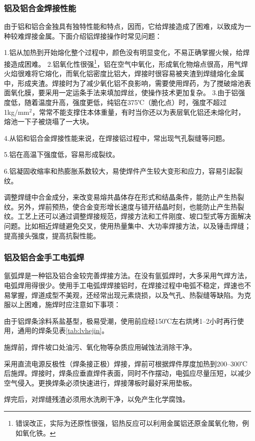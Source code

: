 \documentclass{ctexbook}
\begin{document}
\subsubsection{铝及铝合金焊接性能}
由于铝和铝合金独具有独特性能和特点，因而，它给焊接造成了困难，以致成为一种较难焊接金属。下面介绍铝焊接操作时常见问题：

1.铝从加热到开始熔化整个过程中，颜色没有明显变化，不易正确掌握火候，给焊接造成困难。
2.铝氧化性很强\footnote{错误改正，实际为还原性很强，铝热反应可以利用金属铝还原金属氧化物，例如氧化铁。}，铝在空气中氧化，形成氧化物熔点很高，用气焊火焰很难将它熔化，而氧化铝密度比铝大，焊接时很容易被夹渣到焊缝熔化金属中，形成夹渣。焊接时为了减少氧化铝不良影响，需要使用焊药，为了搅破熔池表面氧化膜，要采用一定运条手法来填加焊丝，使操作技术更加复杂。
3.由于铝强度低，随着温度升高，强度更低，纯铝在375℃（脆化点）时，强度不超过1kg/mm$^{2}$，常常不能支撑住本体重量，有时当你还以为表层氧化铝还未熔化时，熔池一下子被烧塌了一大块。

4.从铝和铝合金焊接性能来说，在焊接铝过程中，常出现气孔裂缝等问题。

5.铝在高温下强度低，容易形成裂纹。

6.铝凝固收缩率和热膨胀系数较大，易使焊件产生较大变形和应力，容易引起裂纹。

调整焊缝中合金成分，来改变易熔共晶体存在形式和结晶条件，能防止产生热裂纹。另外，焊前预热，使合金变形增长速度与错开结晶时刻，也能防止产生热裂纹。工艺上还可以通过调整焊接规范，焊接方法和工件刚度、坡口型式等方面解决问题。比如相近焊缝避免交叉，使用热量集中、大功率焊接方法，以及锤击焊缝；提高接头强度，提高抗裂性能。
\subsubsection{铝及铝合金手工电弧焊}	
氩弧焊是一种铝及铝合金较完善焊接方法。在没有氩弧焊时，大多采用气焊方法，电弧焊用得很少。使用手工电弧焊焊接铝时，在焊接过程中电弧不稳定，焊速也不易掌握，焊道成型不美观，还经常出现元素烧损，以及气孔、热裂缝等缺陷。为克服以上困难，施焊时应注意如下事项：

由于铝焊条涂料系盐基型，极易受潮，使用前应经150℃左右烘烤1--2小时再行使用，通用的焊条见表\ref{tab:lvhejin}。

施焊前，焊件坡口处油污、氧化物等杂质应用碱蚀法消除干净。

采用直流电源反极性（焊条接正极）焊接，焊前可根据焊件厚度加热到200--300℃后施焊。焊接时，焊条应垂直焊件表面，同时不作摆动，电弧应尽量压短，以减少空气侵入。更换焊条必须快速进行，焊接薄板时最好采用垫板。

焊完后，对焊缝残渣必须用水洗刷干净，以免产生化学腐蚀。
\end{document}
